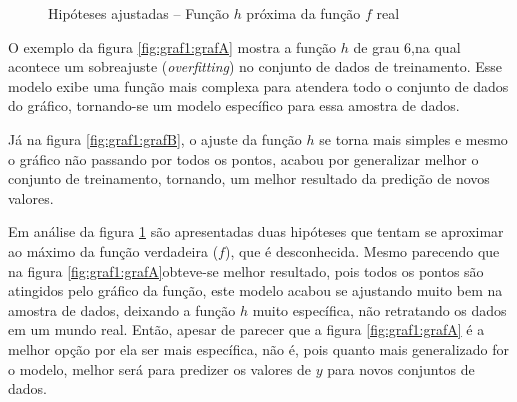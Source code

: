  \begin{figure}[h!]
    \centering
    \quad
    
    \caption{Hipóteses ajustadas – Função ${h}$ próxima da função ${f}$ real} \label{fig:graf1}
        
\end{figure}


O exemplo da figura \ref{fig:graf1:grafA} mostra a função ${h}$  de grau 6,na qual acontece um sobreajuste (\textit{overfitting}) no conjunto de dados de treinamento. Esse modelo exibe uma função mais complexa para atendera todo o conjunto de dados do gráfico, tornando-se um modelo específico para essa amostra de dados. 

Já na figura \ref{fig:graf1:grafB}, o ajuste da função ${h}$ se torna mais simples e mesmo o gráfico não passando por todos os pontos, acabou por generalizar melhor o conjunto de treinamento, tornando, um melhor resultado da predição de novos valores. 

Em análise da figura \ref{fig:graf1} são apresentadas duas hipóteses que tentam se aproximar ao máximo da função verdadeira (${f}$), que é desconhecida. Mesmo parecendo que na figura \ref{fig:graf1:grafA}obteve-se melhor resultado, pois todos os pontos são atingidos pelo gráfico da função, este modelo acabou se ajustando muito bem na amostra de dados, deixando a função ${h}$ muito específica, não retratando os dados em um mundo real. Então, apesar de parecer que a figura \ref{fig:graf1:grafA} é  a melhor opção por ela ser mais específica, não é, pois quanto mais generalizado for o modelo, melhor será para predizer os valores de ${y}$ para novos conjuntos de dados.

